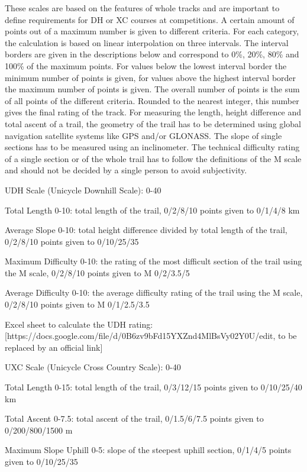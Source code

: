 These scales are based on the features of whole tracks and are important to
define requirements for DH or XC courses at competitions. A certain amount of
points out of a maximum number is given to different criteria. For each
category, the calculation is based on linear interpolation on three intervals.
The interval borders are given in the descriptions below and correspond to 0\%,
20\%, 80\% and 100\% of the maximum points. For values below the lowest interval
border the minimum number of points is given, for values above the highest
interval border the maximum number of points is given. The overall number of
points is the sum of all points of the different criteria. Rounded to the
nearest integer, this number gives the final rating of the track. For measuring
the length, height difference and total ascent of a trail, the geometry of the
trail has to be determined using global navigation satellite systems like GPS
and/or GLONASS. The slope of single sections has to be measured using an
inclinometer. The technical difficulty rating of a single section or of the
whole trail has to follow the definitions of the M scale and should not be
decided by a single person to avoid subjectivity.

UDH Scale (Unicycle Downhill Scale): 0-40

Total Length 0-10: total length of the trail, 0/2/8/10 points given to 0/1/4/8 km

Average Slope 0-10: total height difference divided by total length of the trail, 0/2/8/10 points given to 0/10/25/35%

Maximum Difficulty 0-10: the rating of the most difficult section of the trail using the M scale, 0/2/8/10 points given to M 0/2/3.5/5

Average Difficulty 0-10: the average difficulty rating of the trail using the M scale, 0/2/8/10 points given to M 0/1/2.5/3.5

Excel sheet to calculate the UDH rating: [https://docs.google.com/file/d/0B6zv9bFd15YXZnd4MlBsVy02Y0U/edit, to be replaced by an official link]

UXC Scale (Unicycle Cross Country Scale): 0-40

Total Length 0-15: total length of the trail, 0/3/12/15 points given to 0/10/25/40 km

Total Ascent 0-7.5: total ascent of the trail, 0/1.5/6/7.5 points given to 0/200/800/1500 m

Maximum Slope Uphill 0-5: slope of the steepest uphill section, 0/1/4/5 points given to 0/10/25/35%

